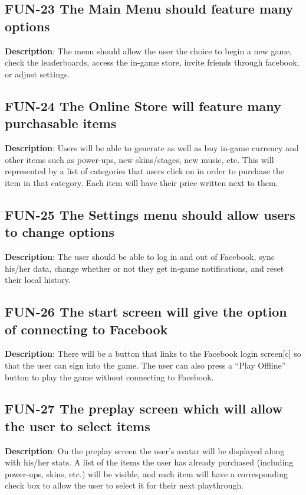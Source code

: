 \subsection{FUN-23 The Main Menu should feature many options}
\textbf{Description}: The menu should allow the user the choice to
begin a new game, check the leaderboards, access the in-game store,
invite friends through facebook, or adjust settings.

\subsection{FUN-24 The Online Store will feature many purchasable items}
\textbf{Description}: Users will be able to generate as well as buy
in-game currency and other items such as power-ups, new skins/stages,
new music, etc. This will represented by a list of categories that
users click on in order to purchase the item in that category. Each
item will have their price written next to them.

\subsection{FUN-25 The Settings menu should allow users to change options}
\textbf{Description}: The user should be able to log in and out of
Facebook, sync his/her data, change whether or not they get in-game
notifications, and reset their local history.

\subsection{FUN-26 The start screen will give the option of connecting to Facebook}
\textbf{Description}: There will be a button that links to the Facebook
login screen{[}c{]} so that the user can sign into the game. The user
can also press a \textquotedblleft{}Play Offline\textquotedblright{}
button to play the game without connecting to Facebook.

\subsection{FUN-27 The preplay screen which will allow the user to select items}
\textbf{Description}: On the preplay screen the user\textquoteright{}s
avatar will be displayed along with his/her stats. A list of the items
the user has already purchased (including power-ups, skins, etc.)
will be visible, and each item will have a corresponding check box
to allow the user to select it for their next playthrough.

